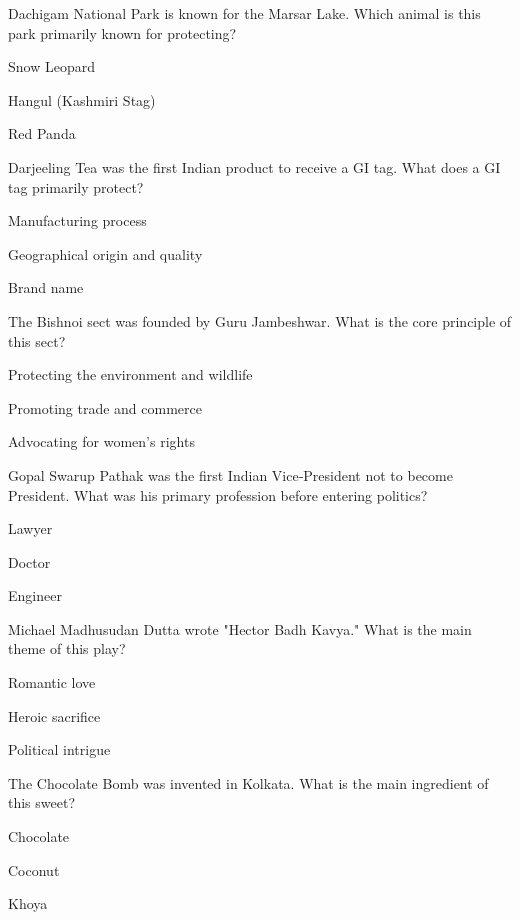 \begin{enhancedmcq}{Dachigam National Park is known for the Marsar Lake. Which animal is this park primarily known for protecting?}
\item Snow Leopard
\item Hangul (Kashmiri Stag)
\item Red Panda

\end{enhancedmcq}
\begin{enhancedmcq}{Darjeeling Tea was the first Indian product to receive a GI tag. What does a GI tag primarily protect?}
\item Manufacturing process
\item Geographical origin and quality
\item Brand name

\end{enhancedmcq}
\begin{enhancedmcq}{The Bishnoi sect was founded by Guru Jambeshwar. What is the core principle of this sect?}
\item Protecting the environment and wildlife
\item Promoting trade and commerce
\item Advocating for women's rights

\end{enhancedmcq}
\begin{enhancedmcq}{Gopal Swarup Pathak was the first Indian Vice‑President not to become President. What was his primary profession before entering politics?}
\item Lawyer
\item Doctor
\item Engineer

\end{enhancedmcq}
\begin{enhancedmcq}{Michael Madhusudan Dutta wrote "Hector Badh Kavya." What is the main theme of this play?}
\item Romantic love
\item Heroic sacrifice
\item Political intrigue

\end{enhancedmcq}
\begin{enhancedmcq}{The Chocolate Bomb was invented in Kolkata. What is the main ingredient of this sweet?}
\item Chocolate
\item Coconut
\item Khoya

\end{enhancedmcq}
